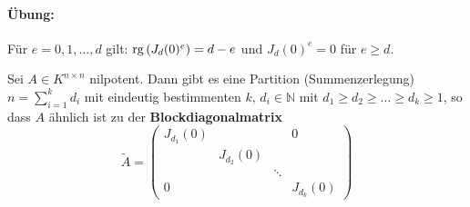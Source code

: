\documentclass[parskip,a4paper,twoside,DIV15,BCOR12mm]{scrbook}
\begin{document}
\paragraph{Übung:}{Für \(e=0,1,\ldots,d\) gilt:
\(\operatorname{rg}\left(J_{d}(0)^{e}\right)=d-e\) und 
    \(J_{d}(0)^{e}=0\) für \(e\geq d\).}
\begin{theo}
\label{Satz 14.4}
Sei \(A\in K^{n\times n}\) nilpotent. Dann gibt es eine Partition 
(Summenzerlegung) \(n=\sum_{i=1}^{k}{d_{i}}\) mit eindeutig bestimmenten 
\(k,\,d_{i}\in\mathbb{N}\) mit \(d_{1}\geq d_{2}\geq\ldots\geq d_{k}\geq1\), so
dass \(A\) ähnlich ist zu der \textbf{Blockdiagonalmatrix}
\[
\tilde{A}=\begin{pmatrix}
    J_{d_{1}}(0)&&&0\\
    &J_{d_{2}}(0)&&\\
    &&\ddots&\\
    0&&&J_{d_{k}}(0)
\end{pmatrix}
\]
\end{theo}
\end{document}
